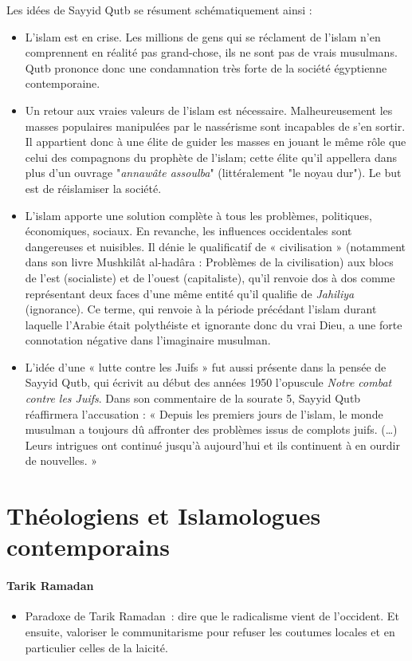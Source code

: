 Les idées de Sayyid Qutb se résument schématiquement ainsi :
\begin{itemize}
    \item 
L'islam est en crise. Les millions de gens qui se réclament de l'islam n'en comprennent en réalité pas grand-chose, ils ne sont pas de vrais musulmans. Qutb prononce donc une condamnation très forte de la société égyptienne contemporaine.
  \item 
Un retour aux vraies valeurs de l'islam est nécessaire. Malheureusement les masses populaires manipulées par le nassérisme sont incapables de s’en sortir. Il appartient donc à une élite de guider les masses en jouant le même rôle que celui des compagnons du prophète de l'islam; cette élite qu'il appellera dans plus d'un ouvrage "\textit{annawâte assoulba}" (littéralement "le noyau dur"). Le but est de réislamiser la société.
  \item 
L'islam apporte une solution complète à tous les problèmes, politiques, économiques, sociaux. En revanche, les influences occidentales sont dangereuses et nuisibles. Il dénie le qualificatif de « civilisation » (notamment dans son livre Mushkilât al-hadâra : Problèmes de la civilisation) aux blocs de l'est (socialiste) et de l'ouest (capitaliste), qu'il renvoie dos à dos comme représentant deux faces d'une même entité qu'il qualifie de \textit{Jahiliya} (ignorance). Ce terme, qui renvoie à la période précédant l'islam durant laquelle l'Arabie était polythéiste et ignorante donc du vrai Dieu, a une forte connotation négative dans l'imaginaire musulman.
  \item 
L'idée d'une « lutte contre les Juifs » fut aussi présente dans la pensée de Sayyid Qutb, qui écrivit au début des années 1950 l'opuscule \textit{Notre combat contre les Juifs}. Dans son commentaire de la sourate 5, Sayyid Qutb réaffirmera l’accusation : « Depuis les premiers jours de l’islam, le monde musulman a toujours dû affronter des problèmes issus de complots juifs. (…) Leurs intrigues ont continué jusqu’à aujourd’hui et ils continuent à en ourdir de nouvelles. » 
\end{itemize}


\section{Théologiens et Islamologues contemporains}
\paragraph{Tarik Ramadan}
 \begin{itemize}
  \item Paradoxe de Tarik Ramadan~: dire que le radicalisme vient de
    l'occident. Et ensuite, valoriser le communitarisme pour refuser les
    coutumes locales et en particulier celles de la laicité.
  \end{itemize}
  
